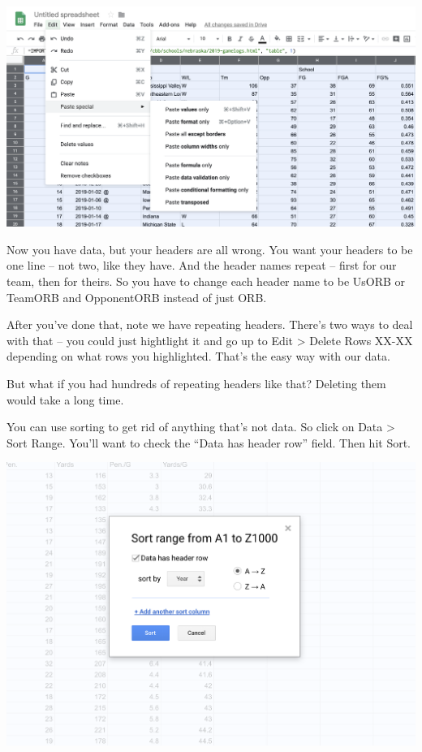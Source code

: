 \documentclass[
]{book}
\begin{document}
\includegraphics[width=36.81in]{images/clean2}

Now you have data, but your headers are all wrong. You want your headers to be one line -- not two, like they have. And the header names repeat -- first for our team, then for theirs. So you have to change each header name to be UsORB or TeamORB and OpponentORB instead of just ORB.

After you've done that, note we have repeating headers. There's two ways to deal with that -- you could just hightlight it and go up to Edit \textgreater{} Delete Rows XX-XX depending on what rows you highlighted. That's the easy way with our data.

But what if you had hundreds of repeating headers like that? Deleting them would take a long time.

You can use sorting to get rid of anything that's not data. So click on Data \textgreater{} Sort Range. You'll want to check the ``Data has header row'' field. Then hit Sort.

\includegraphics[width=21.61in]{images/clean3}
\end{document}
